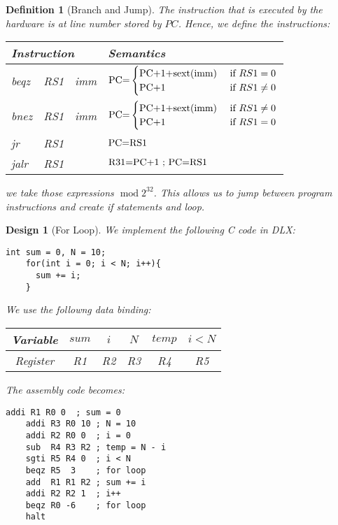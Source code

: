 \documentclass[12pt]{article}
\DeclareMathOperator{\fmod}{mod}
\newtheorem{definition}[theorem]{Definition}
\newtheorem{design}[theorem]{Design}
\begin{document}
\begin{definition}[Branch and Jump]
  The instruction that is executed by the hardware is at line number stored by $PC$. Hence, we define the instructions:
  \begin{table}[H]
    \centering
      \begin{tabular}{lll|l}
      \multicolumn{3}{l|}{Instruction} & Semantics \\ \hline
      beqz & RS1 & imm & $\textup{PC=}\begin{cases}
        \textup{PC+1+\text{sext}(\text{imm})}&\text{ if }RS1=0\\
        \textup{PC+1}&\text{ if }RS1\neq 0
      \end{cases}$\\
      bnez & RS1 & imm & $\textup{PC=}\begin{cases}
        \textup{PC+1+\text{sext}(\text{imm})}&\text{ if }RS1\neq 0\\
        \textup{PC+1}&\text{ if }RS1=0
      \end{cases}$\\
      jr & RS1 & & $\textup{PC=RS1}$\\
      jalr & RS1 & & $\textup{R31=PC+1 ; PC=RS1}$
    \end{tabular}
  \end{table}
  \noindent we take those expressions $\fmod 2^{32}$. This allows us to jump between program instructions and create if statements and loop.
\end{definition}

\begin{design}[For Loop]
  We implement the following C code in DLX:
  \begin{lstlisting}[style=C]
    int sum = 0, N = 10;
    for(int i = 0; i < N; i++){
      sum += i;
    }
  \end{lstlisting}
  We use the followng data binding:
  \begin{table}[H]
    \centering
    \begin{tabular}{|*{6}{c|}}\hline
      Variable & $sum$ & $i$ & $N$ & $temp$ & $i<N$ \\\hline
      Register & R1 & R2 & R3 & R4 & R5 \\\hline
    \end{tabular}
  \end{table}  
  \noindent %
  The assembly code becomes:
  \begin{lstlisting}[style=DLX]
    addi R1 R0 0  ; sum = 0
    addi R3 R0 10 ; N = 10
    addi R2 R0 0  ; i = 0
    sub  R4 R3 R2 ; temp = N - i
    sgti R5 R4 0  ; i < N
    beqz R5  3    ; for loop
    add  R1 R1 R2 ; sum += i
    addi R2 R2 1  ; i++
    beqz R0 -6    ; for loop
    halt
  \end{lstlisting}
\end{design}
\end{document}
